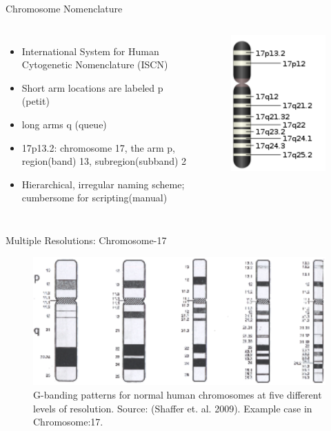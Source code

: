\documentclass[dvips]{beamer}
\begin{document}
\begin{frame}{Chromosome Nomenclature }
\begin{columns}
\begin{itemize}
  \item International System for Human Cytogenetic Nomenclature (ISCN)
  \item Short arm locations are labeled p (petit) 
  \item long arms q (queue)
  \item 17p13.2: chromosome 17, the arm p, region(band) 13, subregion(subband) 2
  \item Hierarchical, irregular naming scheme; cumbersome for scripting(manual)
\end{itemize}
\begin{figure}
\includegraphics[height=5.7 cm]{figures/nchr17}
\end{figure}
\end{columns}
\end{frame}


\begin{frame}{Multiple Resolutions: Chromosome-17}
\begin{figure}
\includegraphics{figures/bands17}
\caption{G-banding patterns for normal human chromosomes at five different levels of resolution. Source: (Shaffer et. al. 2009). Example case in Chromosome:17.}
\end{figure}
\end{frame}
\end{document}
